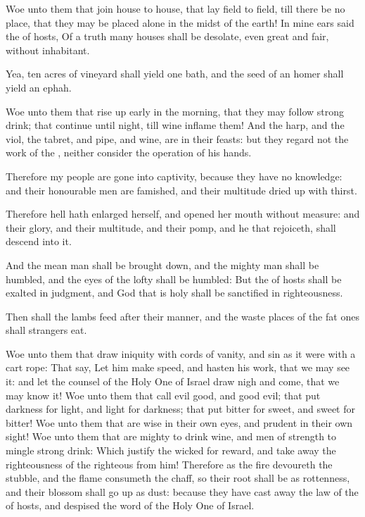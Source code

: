 \verse Woe unto them that join house to house, that lay field to field, till there be no place, that they may be placed alone in the midst of the earth!  \verse In mine ears said the \LORD of hosts, Of a truth many houses shall be desolate, even great and fair, without inhabitant.

\verse Yea, ten acres of vineyard shall yield one bath, and the seed of an homer shall yield an ephah.

\verse Woe unto them that rise up early in the morning, that they may follow strong drink; that continue until night, till wine inflame them!  \verse And the harp, and the viol, the tabret, and pipe, and wine, are in their feasts: but they regard not the work of the \LORD, neither consider the operation of his hands.

\verse Therefore my people are gone into captivity, because they have no knowledge: and their honourable men are famished, and their multitude dried up with thirst.

\verse Therefore hell hath enlarged herself, and opened her mouth without measure: and their glory, and their multitude, and their pomp, and he that rejoiceth, shall descend into it.

\verse And the mean man shall be brought down, and the mighty man shall be humbled, and the eyes of the lofty shall be humbled: \verse But the \LORD of hosts shall be exalted in judgment, and God that is holy shall be sanctified in righteousness.

\verse Then shall the lambs feed after their manner, and the waste places of the fat ones shall strangers eat.

\verse Woe unto them that draw iniquity with cords of vanity, and sin as it were with a cart rope: \verse That say, Let him make speed, and hasten his work, that we may see it: and let the counsel of the Holy One of Israel draw nigh and come, that we may know it!  \verse Woe unto them that call evil good, and good evil; that put darkness for light, and light for darkness; that put bitter for sweet, and sweet for bitter!  \verse Woe unto them that are wise in their own eyes, and prudent in their own sight!  \verse Woe unto them that are mighty to drink wine, and men of strength to mingle strong drink: \verse Which justify the wicked for reward, and take away the righteousness of the righteous from him!  \verse Therefore as the fire devoureth the stubble, and the flame consumeth the chaff, so their root shall be as rottenness, and their blossom shall go up as dust: because they have cast away the law of the \LORD of hosts, and despised the word of the Holy One of Israel.

